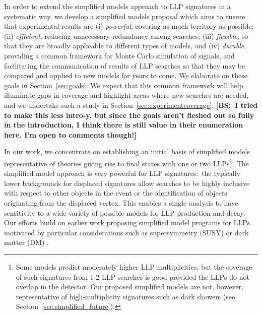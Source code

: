 In order to extend the simplified models approach to LLP signatures in a systematic way, we develop a simplified models proposal which aims to ensure that experimental results are (i) {\em powerful}, covering as much territory as possible; (ii) {\em efficient}, reducing unnecessary redundancy among searches; (iii) {\em flexible}, so that they are broadly applicable to different types of models, and (iv) {\em durable}, providing a common framework for Monte Carlo simulation of signals, and facilitating the communication of results of LLP searches so that they may be compared and applied to new models for years to come. We elaborate on these goals in Section~\ref{sec:goals}.
We expect that this common framework will help illuminate gaps in coverage and highlight areas where new searches are needed, and we undertake such a study in Section~\ref{sec:experimentcoverage}. {\bf [BS:~I tried to make this less intro-y, but since the goals aren't fleshed out so fully in the introduction, I think there is still value in their enumeration here. I'm open to comments though!]}




In our work, we concentrate on establishing an initial basis of simplified models representative of theories giving rise to final states with one or two LLPs\footnote{Some models predict moderately higher LLP multiplicities, but the coverage of such signatures from 1-2 LLP searches is good provided the LLPs do not overlap in the detector. Our proposed simplified models are not, however, representative of high-multiplicity signatures such as dark showers (see Section~\ref{sec:simplified_future}).}.  The simplified model approach is very powerful for LLP signatures:~the typically lower backgrounds for displaced signatures allow searches to be highly inclusive with respect to other objects in the event or the identification of objects originating from the displaced vertex. This enables a single analysis to have sensitivity to a wide variety of possible models for LLP production and decay. Our efforts build on earlier work proposing simplified model programs for LLPs motivated by particular considerations such as supersymmetry (SUSY) or dark matter (DM) \cite{Heisig:2012zq,Liu:2015bma,Heisig:2015yla,Khoze:2017ixx,Mahbubani:2017gjh,Buchmueller:2017uqu}. 

